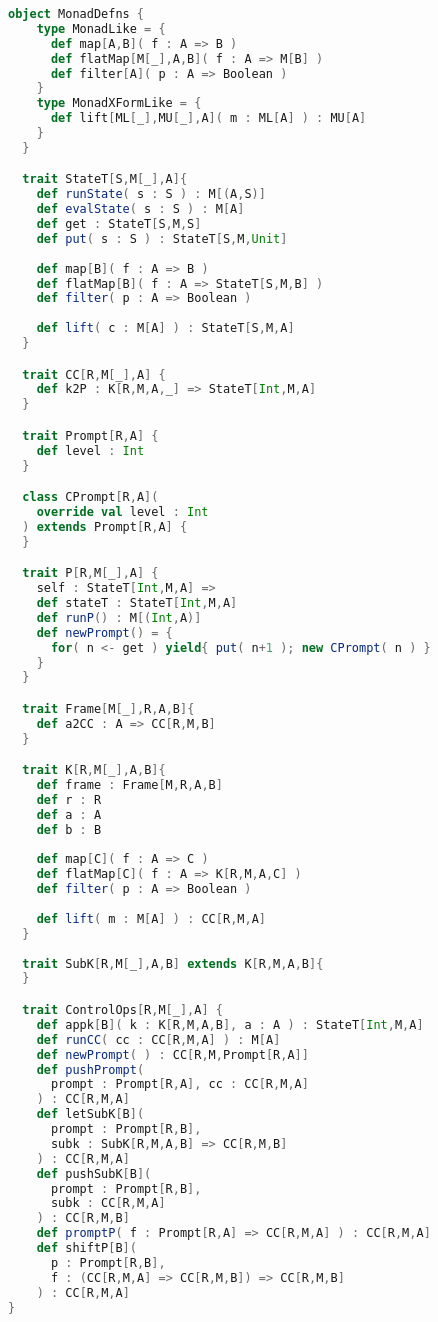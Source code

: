 \begin{lstlisting}[language=Scala,mathescape=true]
  object MonadDefns {
    type MonadLike = { 
      def map[A,B]( f : A => B )
      def flatMap[M[_],A,B]( f : A => M[B] )
      def filter[A]( p : A => Boolean )    
    }
    type MonadXFormLike = {
      def lift[ML[_],MU[_],A]( m : ML[A] ) : MU[A]
    }
  }

  trait StateT[S,M[_],A]{
    def runState( s : S ) : M[(A,S)]
    def evalState( s : S ) : M[A]
    def get : StateT[S,M,S]
    def put( s : S ) : StateT[S,M,Unit]
    
    def map[B]( f : A => B )
    def flatMap[B]( f : A => StateT[S,M,B] )
    def filter( p : A => Boolean )
    
    def lift( c : M[A] ) : StateT[S,M,A]
  }

  trait CC[R,M[_],A] {
    def k2P : K[R,M,A,_] => StateT[Int,M,A]
  }

  trait Prompt[R,A] {
    def level : Int
  }

  class CPrompt[R,A](
    override val level : Int
  ) extends Prompt[R,A] {
  }

  trait P[R,M[_],A] {
    self : StateT[Int,M,A] =>
    def stateT : StateT[Int,M,A]
    def runP() : M[(Int,A)] 
    def newPrompt() = {
      for( n <- get ) yield{ put( n+1 ); new CPrompt( n ) }
    }
  }

  trait Frame[M[_],R,A,B]{
    def a2CC : A => CC[R,M,B]
  }

  trait K[R,M[_],A,B]{
    def frame : Frame[M,R,A,B]
    def r : R
    def a : A
    def b : B
    
    def map[C]( f : A => C )
    def flatMap[C]( f : A => K[R,M,A,C] )
    def filter( p : A => Boolean )
    
    def lift( m : M[A] ) : CC[R,M,A]
  }
  
  trait SubK[R,M[_],A,B] extends K[R,M,A,B]{
  }

  trait ControlOps[R,M[_],A] {
    def appk[B]( k : K[R,M,A,B], a : A ) : StateT[Int,M,A]
    def runCC( cc : CC[R,M,A] ) : M[A]
    def newPrompt( ) : CC[R,M,Prompt[R,A]]
    def pushPrompt(
      prompt : Prompt[R,A], cc : CC[R,M,A]
    ) : CC[R,M,A]
    def letSubK[B](
      prompt : Prompt[R,B],
      subk : SubK[R,M,A,B] => CC[R,M,B]
    ) : CC[R,M,A]
    def pushSubK[B](
      prompt : Prompt[R,B],
      subk : CC[R,M,A] 
    ) : CC[R,M,B]
    def promptP( f : Prompt[R,A] => CC[R,M,A] ) : CC[R,M,A]
    def shiftP[B](
      p : Prompt[R,B],
      f : (CC[R,M,A] => CC[R,M,B]) => CC[R,M,B]
    ) : CC[R,M,A]
}
\end{lstlisting}

